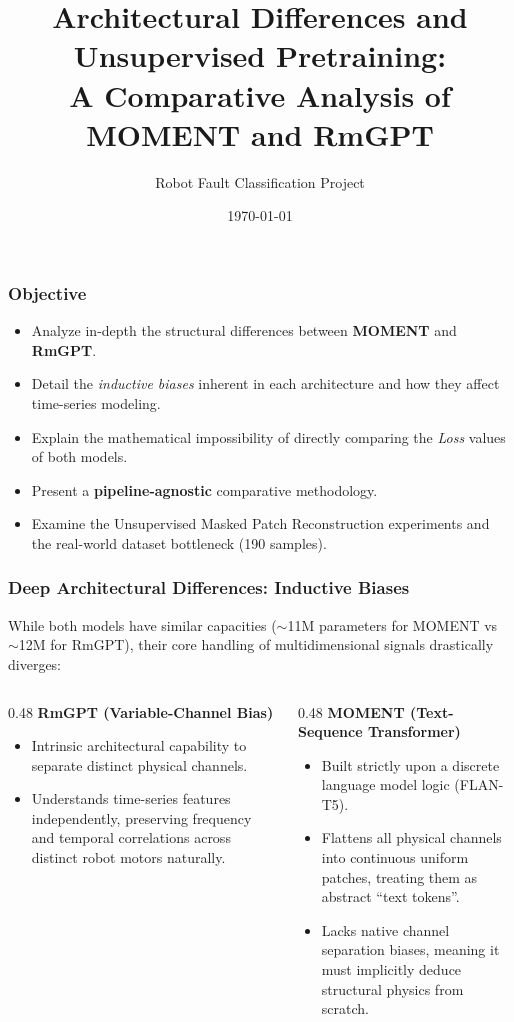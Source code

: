 \documentclass[10pt, aspectratio=169]{beamer}
\title[MOMENT vs RmGPT]{Architectural Differences and Unsupervised Pretraining: \\ A Comparative Analysis of MOMENT and RmGPT}
\author{Robot Fault Classification Project}
\date{\today}
\begin{document}
\begin{frame}[plain]
    \titlepage
\end{frame}

\begin{frame}
    \frametitle{Objective}
    \begin{itemize}
        \item Analyze in-depth the structural differences between \textbf{MOMENT} and \textbf{RmGPT}.
        \item Detail the \textit{inductive biases} inherent in each architecture and how they affect time-series modeling.
        \item Explain the mathematical impossibility of directly comparing the \textit{Loss} values of both models.
        \item Present a \textbf{pipeline-agnostic} comparative methodology.
        \item Examine the Unsupervised Masked Patch Reconstruction experiments and the real-world dataset bottleneck (190 samples).
    \end{itemize}
\end{frame}

\begin{frame}
    \frametitle{Deep Architectural Differences: Inductive Biases}
    While both models have similar capacities ($\sim$11M parameters for MOMENT vs $\sim$12M for RmGPT), their core handling of multidimensional signals drastically diverges:
    \vspace{0.3cm}
    \begin{columns}[T]
        \begin{column}{0.48\textwidth}
            \textbf{RmGPT (Variable-Channel Bias)}
            \begin{itemize} %
                \item Intrinsic architectural capability to separate distinct physical channels.
                \item Understands time-series features independently, preserving frequency and temporal correlations across distinct robot motors naturally.
            \end{itemize}
        \end{column}
        \hfill
        \begin{column}{0.48\textwidth}
            \textbf{MOMENT (Text-Sequence Transformer)}
            \begin{itemize} %
                \item Built strictly upon a discrete language model logic (FLAN-T5).
                \item Flattens all physical channels into continuous uniform patches, treating them as abstract ``text tokens''.
                \item Lacks native channel separation biases, meaning it must implicitly deduce structural physics from scratch.
            \end{itemize}
        \end{column}
    \end{columns}
\end{frame}
\end{document}
